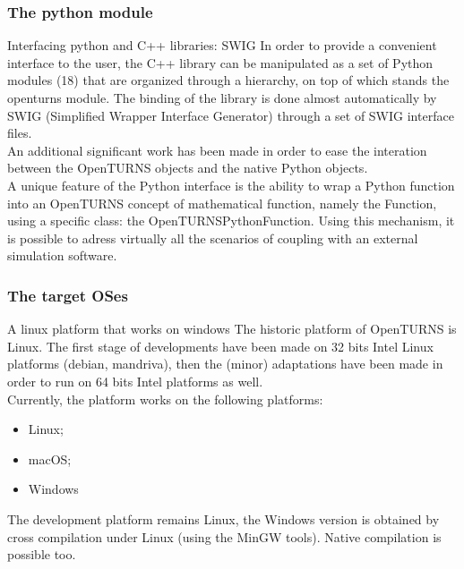 \documentclass[8pt]{beamer}
\begin{document}
\begin{frame}
  \frametitle{The python module}
  \begin{block}{Interfacing python and C++ libraries: SWIG}
    In order to provide a convenient interface to the user, the C++ library can be manipulated as a set of Python modules (18) that are organized through a hierarchy, on top of which stands the openturns module. The binding of the library is done almost automatically by SWIG (Simplified Wrapper Interface Generator) through a set of SWIG interface files.\\
    An additional significant work has been made in order to ease the interation between the OpenTURNS objects and the native Python objects.\\
    A unique feature of the Python interface is the ability to wrap a Python function into an OpenTURNS concept of mathematical function, namely the Function, using a specific class: the OpenTURNSPythonFunction. Using this mechanism, it is possible to adress virtually all the scenarios of coupling with an external simulation software.
  \end{block}
\end{frame}
\begin{frame}
  \frametitle{The target OSes}
  \begin{block}{A linux platform that works on windows}
    The historic platform of OpenTURNS is Linux. The first stage of developments have been made on 32 bits Intel Linux platforms (debian, mandriva), then the (minor) adaptations have been made in order to run on 64 bits Intel platforms as well.\\
    Currently, the platform works on the following platforms:
    \begin{itemize}
      \item Linux;
      \item macOS;
      \item Windows
    \end{itemize}
    The development platform remains Linux, the Windows version is obtained by cross compilation under Linux (using the MinGW tools). Native compilation is possible too.
  \end{block}
\end{frame}
\end{document}
